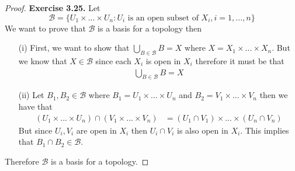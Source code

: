 \documentclass[11pt]{article}
\theoremstyle{definition}
\begin{document}
\begin{proof}{\textbf{Exercise 3.25.}}
    Let $$\mathcal{B} = \{U_1 \times ... \times U_n : U_i
    \text{ is an open subset of }X_i, i =1, ..., n\}$$
    We want to prove that $\mathcal{B}$ is a basis for a topology then
    \begin{itemize}
        \item [(i)] First, we want to show that
        $\bigcup_{B \in\mathcal{B}} B = X$
        where $X = X_1 \times ... \times X_n$.
        But we know that $X \in \mathcal{B}$ since each $X_i$ is open in $X_i$
        therefore it must be that 
        \begin{align*}
            \bigcup_{B \in \mathcal{B}} B = X
        \end{align*}
        \item [(ii)] Let $B_1, B_2 \in \mathcal{B}$ where
        $B_1 = U_1 \times ... \times U_n$ and $B_2 = V_1 \times ... \times V_n$
        then we have that
        \begin{align*}
            (U_1 \times ... \times U_n) \cap (V_1 \times ... \times V_n)
            &= (U_1 \cap V_1) \times ... \times (U_n \cap V_n)
        \end{align*}
        But since $U_i, V_i$ are open in $X_i$ then $U_i \cap V_i$ is also
        open in $X_i$. This implies that $B_1 \cap B_2 \in \mathcal{B}$.
    \end{itemize} 
    Therefore $\mathcal{B}$ is a basis for a topology.
\end{proof}
\cleardoublepage
\end{document}
